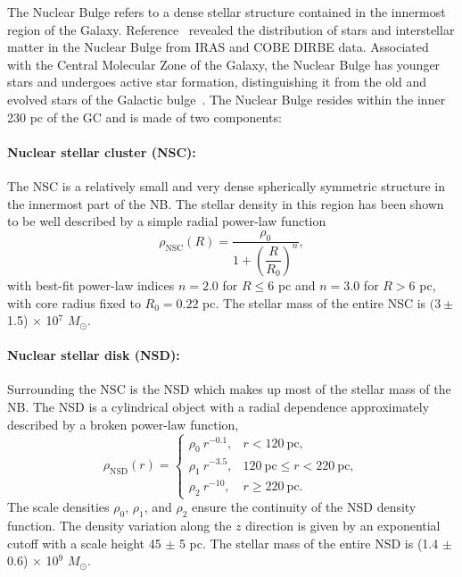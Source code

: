 \documentclass[doublespace,nopageskip]{VTthesis} %
\begin{document}
The Nuclear Bulge refers to a dense stellar structure contained in the innermost region of the Galaxy. 
Reference~\cite{2002A&A...384..112L} revealed the distribution of stars and interstellar matter in the Nuclear Bulge from IRAS and COBE DIRBE data. Associated with the Central Molecular Zone of the Galaxy, the Nuclear Bulge has younger stars and undergoes active star formation, distinguishing it from the old and evolved stars of the Galactic bulge~\cite{2002A&A...384..112L}. 
The Nuclear Bulge resides within the inner 230 pc of the GC and is made of two components:

\paragraph{Nuclear stellar cluster (NSC):} The NSC is a relatively small and very dense spherically symmetric structure in the innermost part of the NB. The stellar density in this region has been shown~\cite{2002A&A...384..112L} to be well described by a simple radial power-law function
\begin{equation}\label{eq:NSC}
  \rho_{\text{NSC}}(R)=\dfrac{\rho_0}{1+\left(\dfrac{R}{R_0}\right)^{n}},
\end{equation}
with best-fit power-law indices $n = 2.0$ for $R \leq 6$ pc and $n = 3.0$ for $R > 6$ pc, with core radius fixed to $R_0 = 0.22$ pc. The stellar mass of the entire NSC is $(3\pm$ 1.5) $\times$ 10$^7$ $M_\odot$.

\paragraph{Nuclear stellar disk (NSD):} Surrounding the NSC is the NSD which makes up most of the stellar mass of the NB. The NSD is a cylindrical object with a radial dependence approximately described by a broken power-law function,
\begin{equation}\label{eq:NSD}
  \rho_{\text{NSD}}(r) = \begin{cases}
    \rho_0\ r^{-0.1}, & r < 120\ \text{pc},\\
    \rho_1\ r^{-3.5}, & 120\ \text{pc} \leq r < 220\ \text{pc},\\
    \rho_2\ r^{-10}, & r \geq 220\ \text{pc}.
  \end{cases}
\end{equation}
The scale densities $\rho_0$, $\rho_1$, and $\rho_2$ ensure the continuity of the NSD density function. The density variation along the $z$ direction is given by an exponential cutoff with a scale height 45 $\pm$ 5 pc. The stellar mass of the entire NSD is (1.4 $\pm$ 0.6) $\times$ 10$^9$ $M_\odot$.
\end{document}
